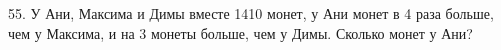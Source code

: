 55. У Ани, Максима и Димы вместе 1410 монет, у Ани монет в 4 раза больше, чем у Максима, и на 3 монеты больше, чем у Димы. Сколько монет у Ани?\\
